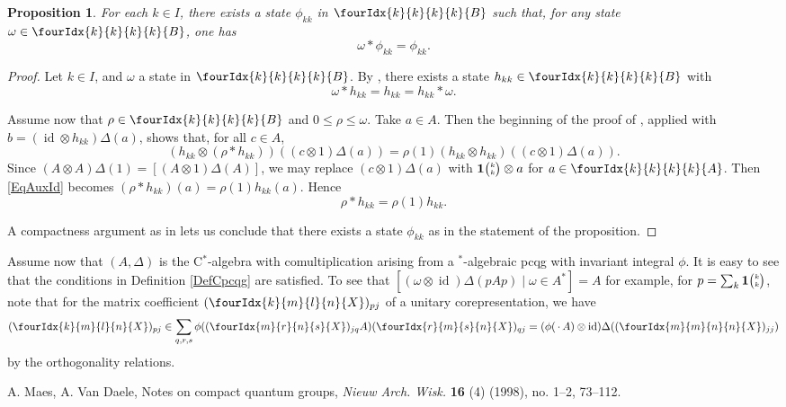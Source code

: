 \documentclass[11pt]{article}
\DeclareMathOperator{\id}{id}
\newcommand{\Grt}[3]{#1{\tiny {\begin{pmatrix} #2\\#3\end{pmatrix}}}}
\newcommand{\UnitC}[2]{\Grt{\mathbf{1}}{#1}{#2}}
\newcommand{\Gr}[5]{\fourIdx{#2}{#4}{#3}{#5}{#1}}%
\newtheorem{Prop}[Theorem]{Proposition}
\theoremstyle{definition}
\numberwithin{equation}{section}
\begin{document}
\begin{Prop} For each $k\in I$, there exists a state $\phi_{kk}$ in $\Gr{B}{k}{k}{k}{k}$ such that, for any state $\omega \in \Gr{B}{k}{k}{k}{k}$, one has \[\omega*\phi_{kk} =\phi_{kk}.\]
\end{Prop} 
\begin{proof} Let $k\in I$, and $\omega$ a state in $\Gr{B}{k}{k}{k}{k}$. By \cite[Lemma 4.2]{MVD1}, there exists a state $h_{kk} \in \Gr{B}{k}{k}{k}{k}$ with \[\omega *h_{kk}= h_{kk} = h_{kk}*\omega.\]

Assume now that $\rho\in \Gr{B}{k}{k}{k}{k}$ and $0\leq \rho\leq \omega$. Take $a\in A$. Then the beginning of the proof of \cite[Lemma 4.3]{MVD1}, applied with $b= (\id\otimes h_{kk})\Delta(a)$, shows that, for all $c\in A$, \begin{equation}\label{EqAuxId} (h_{kk}\otimes (\rho*h_{kk}))((c\otimes 1)\Delta(a)) = \rho(1) (h_{kk}\otimes h_{kk})((c\otimes 1)\Delta(a)).\end{equation} Since $(A\otimes A)\Delta(1) = [(A\otimes 1)\Delta(A)]$, we may replace $(c\otimes 1)\Delta(a)$ with $\UnitC{k}{k}\otimes a$ for $a\in \Gr{A}{k}{k}{k}{k}$. Then \eqref{EqAuxId} becomes $(\rho*h_{kk})(a) = \rho(1)h_{kk}(a)$. Hence \[\rho*h_{kk} = \rho(1)h_{kk}.\] 

A compactness argument as in \cite[Theorem 4.4]{MVD1} lets us conclude that there exists a state $\phi_{kk}$ as in the statement of the proposition.
\end{proof}


  Assume now that $(A,\Delta)$ is the C$^*$-algebra with comultiplication arising from a $^*$-algebraic pcqg with invariant integral $\phi$. It is easy to see that the conditions in Definition \ref{DefCpcqg} are satisfied. To see that $[(\omega\otimes \id)\Delta(pAp)\mid \omega \in A^*] = A$ for example, for $p = \sum_{k} \UnitC{k}{k}$, note that for the matrix coefficient $(\Gr{X}{k}{l}{m}{n})_{pj}$ of a unitary corepresentation, we have \[ (\Gr{X}{k}{l}{m}{n})_{pj} \in \sum_{q,r,s} \phi((\Gr{X}{m}{n}{r}{s})_{jq}A) (\Gr{X}{r}{s}{m}{n})_{qj} =(\phi(\,\cdot\, A)\otimes \id)\Delta((\Gr{X}{m}{n}{m}{n})_{jj})\] by the orthogonality relations. 







\begin{thebibliography}{00}

 A. Maes, A. Van Daele, Notes on compact quantum groups, \emph{Nieuw Arch. Wisk.} \textbf{16} (4) (1998), no. 1--2, 73--112. 

\end{thebibliography}
\end{document}
